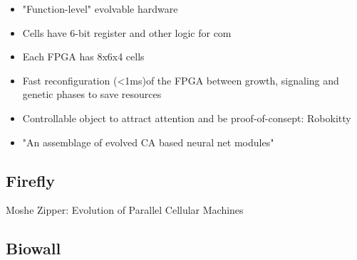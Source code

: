 \begin{itemize}
    \item "Function-level" evolvable hardware
    \item Cells have 6-bit register and other logic for com
    \item Each FPGA has 8x6x4 cells
    \item Fast reconfiguration (<1ms)of the FPGA between growth, signaling and genetic phases to save resources
    \item Controllable object to attract attention and be proof-of-consept: Robokitty
    \item "An assemblage of evolved CA based neural net modules"
\end{itemize}

\subsection{Firefly}

\TODO
Moshe Zipper: Evolution of Parallel Cellular Machines

\subsection{Biowall}

\TODO
